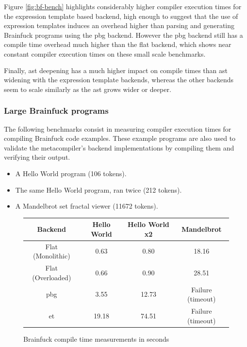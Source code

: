 \documentclass[../main]{subfiles}
\begin{document}
Figure \ref{fig:bf-bench}
highlights considerably higher compiler execution times for the expression
template based backend, high enough to suggest that the use of expression
templates induces an overhead higher than parsing and generating Brainfuck
programs using the \gls{pbg} backend. However the \gls{pbg}
backend still has a compile time overhead much higher than the flat backend,
which shows near constant compiler execution times on these small scale
benchmarks.

Finally, \gls{ast} deepening has a much higher impact on compile times than
\gls{ast} widening with the expression template backends,
whereas the other backends seem to scale similarly as the \gls{ast}
grows wider or deeper.

\subsubsection{
  Large Brainfuck programs
}
\label{lbl:bf-large-program-benches}

The following benchmarks consist in measuring compiler execution times for
compiling Brainfuck code examples. These example programs are also used to
validate the metacompiler's backend implementations by compiling them and
verifying their output.

\begin{itemize}
\item A Hello World program (106 tokens).
\item The same Hello World program, ran twice (212 tokens).
\item A Mandelbrot set fractal viewer (11672 tokens).
\end{itemize}

\begin{figure}[h]
\begin{tabular}{|c|c|c|c|}
\hline
Backend           & Hello World & Hello World x2  & Mandelbrot \\
\hline
Flat (Monolithic) & 0.63        & 0.80            & 18.16 \\
Flat (Overloaded) & 0.66        & 0.90            & 28.51 \\
\gls{pbg}         & 3.55        & 12.73           & Failure (timeout) \\
\gls{et}          & 19.18       & 74.51           & Failure (timeout) \\
\hline
\end{tabular}
\caption{Brainfuck compile time measurements in seconds}
\label{fig:bf-compile-times}
\end{figure}
\end{document}

